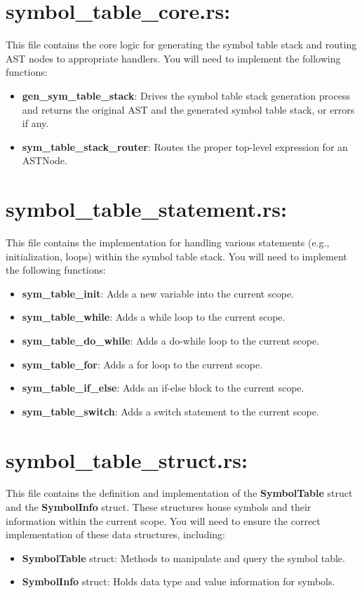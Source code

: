 \documentclass[
	12pt, %
]{fphw}
\begin{document}
\section*{symbol\_table\_core.rs:}
This file contains the core logic for generating the symbol table stack and routing AST nodes to appropriate handlers. You will need to implement the following functions:
\begin{itemize}
    \item \textbf{gen\_sym\_table\_stack}: Drives the symbol table stack generation process and returns the original AST and the generated symbol table stack, or errors if any.
    \item \textbf{sym\_table\_stack\_router}: Routes the proper top-level expression for an ASTNode.
\end{itemize}

\section*{symbol\_table\_statement.rs:}
This file contains the implementation for handling various statements (e.g., initialization, loops) within the symbol table stack. You will need to implement the following functions:
\begin{itemize}
    \item \textbf{sym\_table\_init}: Adds a new variable into the current scope.
    \item \textbf{sym\_table\_while}: Adds a while loop to the current scope.
    \item \textbf{sym\_table\_do\_while}: Adds a do-while loop to the current scope.
    \item \textbf{sym\_table\_for}: Adds a for loop to the current scope.
    \item \textbf{sym\_table\_if\_else}: Adds an if-else block to the current scope.
    \item \textbf{sym\_table\_switch}: Adds a switch statement to the current scope.
\end{itemize}
\pagebreak
\section*{symbol\_table\_struct.rs:}
This file contains the definition and implementation of the \textbf{SymbolTable} struct and the \textbf{SymbolInfo} struct. These structures house symbols and their information within the current scope. You will need to ensure the correct implementation of these data structures, including:
\begin{itemize}
    \item \textbf{SymbolTable} struct: Methods to manipulate and query the symbol table.
    \item \textbf{SymbolInfo} struct: Holds data type and value information for symbols.
\end{itemize}
\end{document}
